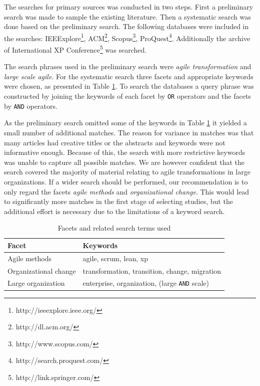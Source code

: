 \documentclass[lnbip]{svmultln}
\begin{document}

The searches for primary sources was conducted in two steps. First a preliminary
search was made to sample the existing literature. Then a systematic search was
done based on the preliminary search. The following databases were included in
the searches: IEEExplore\footnote{http://ieeexplore.ieee.org/},
ACM\footnote{http://dl.acm.org/}, Scopus\footnote{http://www.scopus.com/},
ProQuest\footnote{http://search.proquest.com/}.
Additionally the archive of International XP
Conference\footnote{http://link.springer.com/} was searched.

The search phrases used in the preliminary search were \textit{agile
transformation} and \textit{large scale agile}. For the systematic search three
facets and appropriate keywords were chosen, as presented in Table
\ref{table:searchterms}. To search the databases a query phrase was constructed
by joining the keywords of each facet by \texttt{OR} operators and the facets by
\texttt{AND} operators.

As the preliminary search omitted some of the keywords in Table
\ref{table:searchterms} it yielded a small number of additional matches. The
reason for variance in matches was that many articles had creative titles or the
abstracts and keywords were not informative enough. Because of this, the search
with more restrictive keywords was unable to capture all possible matches.
We are however confident that the search covered the majority of material
relating to agile transformations in large organizations. If a wider search
should be performed, our recommendation is to only regard the facets
\textit{agile methods} and \textit{organizational change}. This would lead to
significantly more matches in the first stage of selecting studies, but the
additional effort is necessary due to the limitations of a keyword search.

\begin{table}[h]
    \begin{tabular}{ l@{ \hskip 0.4cm } l }
        \toprule
        Facet                  & Keywords   \\ \midrule
        Agile methods          & agile, scrum, lean, xp \\ 
        Organizational change  & transformation, transition, change, migration \\
        Large organization     & enterprise, organization, (large \texttt{AND} scale) \\
        \bottomrule
    \end{tabular}
    \caption{Facets and related search terms used}
    \label{table:searchterms}
\end{table}
\end{document}

